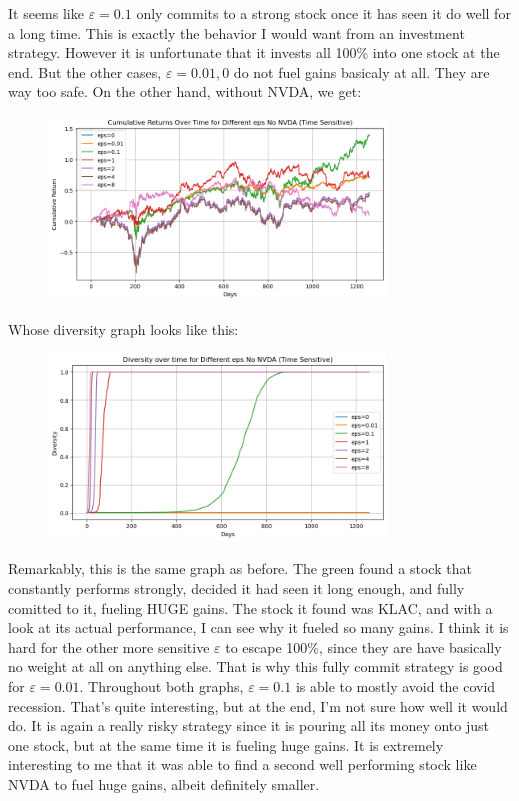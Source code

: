 \documentclass[12pt]{article}
\def\ve{\varepsilon}
\begin{document}
\begin{enumerate}[label=(\alph*)]
\begin{figure}[H]
        \end{figure}
        It seems like $\ve = 0.1$ only commits to a strong stock once it has seen it do well for a long time. This is exactly the behavior I would want from an investment strategy. However it is unfortunate that it invests all 100\% into one stock at the end. But the other cases, $\ve = 0.01,0$ do not fuel gains basicaly at all. They are way too safe. 
        On the other hand, without NVDA, we get:
        \begin{figure}[H]
            \centering
            \includegraphics[width=0.8\textwidth]{cum_returns_diff_eps_time_sensitive_no_NVDA.png}
        \end{figure}
        Whose diversity graph looks like this:
        \begin{figure}[H]
            \centering
            \includegraphics[width=0.8\textwidth]{diversity_graph_time_sensitive_no_NVDA.png}
        \end{figure}
        Remarkably, this is the same graph as before. The green found a stock that constantly performs strongly, decided it had seen it long enough, and fully comitted to it, fueling HUGE gains. The stock it found was KLAC, and with a look at its actual performance, I can see why it fueled so many gains. I think it is hard for the other more sensitive $\ve$ to escape 100\%, since they are have basically no weight at all on anything else. That is why this fully commit strategy is good for $\ve = 0.01$. Throughout both graphs, $\ve = 0.1$ is able to mostly avoid the covid recession. That's quite interesting, but at the end, I'm not sure how well it would do. It is again a really risky strategy since it is pouring all its money onto just one stock, but at the same time it is fueling huge gains. It is extremely interesting to me that it was able to find a second well performing stock like NVDA to fuel huge gains, albeit definitely smaller. 
    \end{enumerate}
\end{document}
